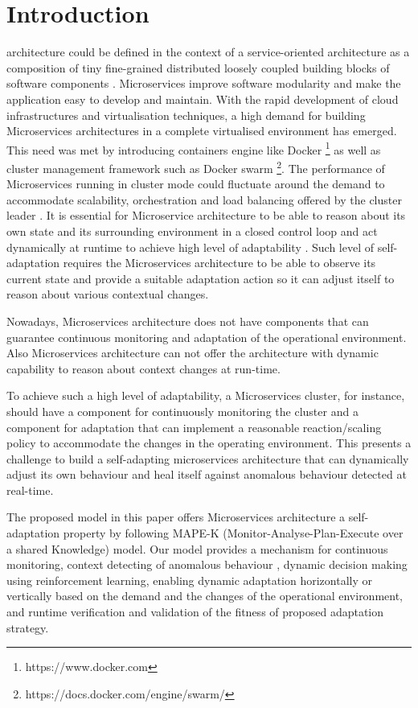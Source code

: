 \documentclass{ieeeaccess}
\begin{document}
\section{Introduction}
\label{sec:introduction}
 architecture could be defined in the context of a service-oriented architecture as a composition of tiny fine-grained distributed loosely coupled building blocks of software components \cite{stubbs2015distributed}. Microservices improve software modularity and make the application easy to develop and maintain. With the rapid development of cloud infrastructures and virtualisation techniques, a high demand for building Microservices architectures in a complete virtualised environment has emerged. This need was met by introducing containers engine like Docker \footnote{https://www.docker.com} as well as cluster management framework such as Docker swarm \footnote{https://docs.docker.com/engine/swarm/}.  
The performance of Microservices running in cluster mode could fluctuate around the demand to accommodate scalability, orchestration and load balancing offered by the cluster leader \cite{stubbs2015distributed}.  It is essential for Microservice architecture to be able to reason about its own state and its surrounding environment in a closed control loop and act dynamically at runtime to achieve high level of adaptability \cite{Cheng:2008p3708}.   
Such level of self-adaptation requires the Microservices architecture to be able to observe its current state and provide a suitable adaptation action so it can adjust itself to reason about various contextual changes.

Nowadays, Microservices architecture does not have components that can guarantee continuous monitoring and adaptation of the operational environment. Also Microservices architecture can not offer the architecture with dynamic capability to reason  about context changes at run-time. 

To achieve such a high level of adaptability, a Microservices cluster, for instance, should have a component for continuously monitoring the cluster and a component for adaptation that can implement a reasonable reaction/scaling policy to accommodate the changes in the operating environment. This presents a challenge to build a self-adapting microservices architecture that can dynamically adjust its own behaviour and heal itself against anomalous behaviour detected at real-time. 

The proposed model in this paper offers Microservices architecture a self-adaptation property by following MAPE-K (Monitor-Analyse-Plan-Execute over a shared Knowledge) model.
Our model provides a mechanism for continuous monitoring, context detecting of anomalous behaviour , dynamic decision making using reinforcement learning, enabling dynamic adaptation horizontally or vertically based on the demand and the changes of the operational environment, and runtime verification and validation of the fitness of proposed adaptation strategy. 
\end{document}
